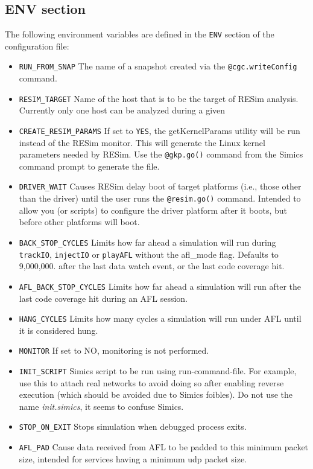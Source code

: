 \documentclass[titlepage]{article}
\begin{document}
\subsection{ENV section}
\label{env}
The following environment variables are defined in the {\tt ENV} section of the configuration file:
\begin{itemize}
\item {\tt RUN\_FROM\_SNAP} The name of a snapshot created via the {\tt @cgc.writeConfig} command.
\item {\tt RESIM\_TARGET} Name of the host that is to be the target of RESim analysis.  Currently only one host can be analyzed during a given
\item {\tt CREATE\_RESIM\_PARAMS} If set to {\tt YES}, the getKernelParams utility will be run instead of the RESim monitor.  This will
generate the Linux kernel parameters needed by RESim.  Use the {\tt @gkp.go()} command from the Simics command prompt to generate the file.
\item {\tt DRIVER\_WAIT} Causes RESim delay boot of target platforms (i.e., those other than the driver) until the 
user runs the {\tt @resim.go()} command.  Intended to allow you (or scripts)
to configure the driver platform after it boots, but before other platforms will boot.
\item {\tt BACK\_STOP\_CYCLES} Limits how far ahead a simulation will run during {\tt trackIO}, {\tt injectIO} or {\tt playAFL} without the
afl\_mode flag. Defaults to 9,000,000. 
after the last data watch event, or the last code coverage hit.
\item {\tt AFL\_BACK\_STOP\_CYCLES} Limits how far ahead a simulation will run after the last code coverage hit during an AFL session.
\item {\tt HANG\_CYCLES} Limits how many cycles a simulation will run under AFL until it is considered hung.
\item {\tt MONITOR} If set to NO, monitoring is not performed.
\item{\tt INIT\_SCRIPT} Simics script to be run using run-command-file.  For example, use this to attach real networks to avoid
doing so after enabling reverse execution (which should be avoided due to Simics foibles).  Do not use the name \textit{init.simics}, it seems
to confuse Simics.
\item {\tt STOP\_ON\_EXIT} Stops simulation when debugged process exits.
\item{\tt AFL\_PAD} Cause data received from AFL to be padded to this minimum packet size, intended for services having a minimum udp packet size.

\end{itemize}
\end{document}
